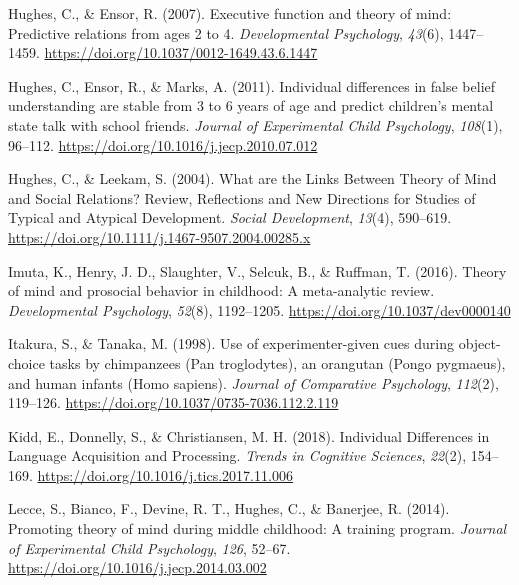 \documentclass[
  man,floatsintext]{apa6}
\newlength{\cslhangindent}
\newlength{\cslentryspacingunit} %
\newenvironment{CSLReferences}[2] %
 {%
  \setlength{\parindent}{0pt}
  \ifodd #1
  \let\oldpar\par
  \def\par{\hangindent=\cslhangindent\oldpar}
  \fi
  \setlength{\parskip}{#2\cslentryspacingunit}
 }%
 {}
\begin{document}
\begin{CSLReferences}{1}{0}
\leavevmode{}%
Hughes, C., \& Ensor, R. (2007). Executive function and theory of mind: {Predictive} relations from ages 2 to 4. \emph{Developmental Psychology}, \emph{43}(6), 1447--1459. \url{https://doi.org/10.1037/0012-1649.43.6.1447}

\leavevmode{}%
Hughes, C., Ensor, R., \& Marks, A. (2011). Individual differences in false belief understanding are stable from 3 to 6 years of age and predict children's mental state talk with school friends. \emph{Journal of Experimental Child Psychology}, \emph{108}(1), 96--112. \url{https://doi.org/10.1016/j.jecp.2010.07.012}

\leavevmode{}%
Hughes, C., \& Leekam, S. (2004). What are the {Links Between Theory} of {Mind} and {Social Relations}? {Review}, {Reflections} and {New Directions} for {Studies} of {Typical} and {Atypical Development}. \emph{Social Development}, \emph{13}(4), 590--619. \url{https://doi.org/10.1111/j.1467-9507.2004.00285.x}

\leavevmode{}%
Imuta, K., Henry, J. D., Slaughter, V., Selcuk, B., \& Ruffman, T. (2016). Theory of mind and prosocial behavior in childhood: {A} meta-analytic review. \emph{Developmental Psychology}, \emph{52}(8), 1192--1205. \url{https://doi.org/10.1037/dev0000140}

\leavevmode{}%
Itakura, S., \& Tanaka, M. (1998). Use of experimenter-given cues during object-choice tasks by chimpanzees ({Pan} troglodytes), an orangutan ({Pongo} pygmaeus), and human infants ({Homo} sapiens). \emph{Journal of Comparative Psychology}, \emph{112}(2), 119--126. \url{https://doi.org/10.1037/0735-7036.112.2.119}

\leavevmode{}%
Kidd, E., Donnelly, S., \& Christiansen, M. H. (2018). Individual {Differences} in {Language Acquisition} and {Processing}. \emph{Trends in Cognitive Sciences}, \emph{22}(2), 154--169. \url{https://doi.org/10.1016/j.tics.2017.11.006}

\leavevmode{}%
Lecce, S., Bianco, F., Devine, R. T., Hughes, C., \& Banerjee, R. (2014). Promoting theory of mind during middle childhood: {A} training program. \emph{Journal of Experimental Child Psychology}, \emph{126}, 52--67. \url{https://doi.org/10.1016/j.jecp.2014.03.002}


\end{CSLReferences}
\end{document}
